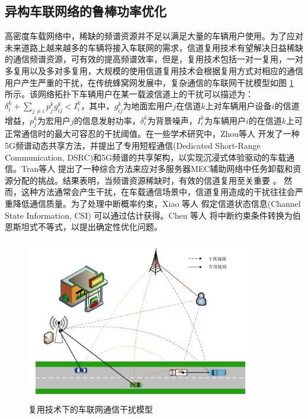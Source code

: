 \subsection{异构车联网络的鲁棒功率优化} \label{section1-2-1}

高密度车载网络中，稀缺的频谱资源并不足以满足大量的车辆用户使用。为了应对未来道路上越来越多的车辆将接入车联网的需求，信道复用技术有望解决日益稀缺的通信频谱资源，可有效的提高频谱效率，但是，复用技术包括一对一复用，一对多复用以及多对多复用，大规模的使用信道复用技术会根据复用方式对相应的通信用户产生严重的干扰，在传统蜂窝网发展中，复杂通信的车联网干扰模型如图 \ref{复用技术下的通信干扰模型} 所示。该网络拓扑下车辆用户在某一载波信道上的干扰可以描述为：$\delta _{i}^{k}+\sum\limits_{j\ne i}{p_{j}^{k}g_{ij}^{k}}<I_{i}^{k}$，其中，$g_{ij}^{k}$为地面宏用户$j$在信道$k$上对车辆用户设备$i$的信道增益，$p_{j}^{k}$为宏用户$j$的信息发射功率，$\delta _{i}^{k}$为背景噪声，$I_{i}^{k}$为车辆用户$i$的在信道$k$上可正常通信时的最大可容忍的干扰阈值。在一些学术研究中，Zhou等人  \supercite{Zhou2017} 开发了一种5G频谱动态共享方法，并提出了专用短程通信(Dedicated Short-Range Communication, DSRC)和5G频谱的共享架构，以实现沉浸式体验驱动的车载通信。Tran等人  \supercite{Tran2019}  提出了一种综合方法来应对多服务器MEC辅助网络中任务卸载和资源分配的挑战。结果表明，当频谱资源稀缺时，有效的信道复用至关重要 \supercite{Liang2021}。 然而，这种方法通常会产生干扰，在车载通信场景中，信道复用造成的干扰往往会严重降低通信质量。为了处理中断概率约束，Xiao 等人 \supercite{Xiao2020} 假定信道状态信息(Channel State Information, CSI) 可以通过估计获得。Chen 等人 \supercite{Chen2022} 将中断约束条件转换为伯恩斯坦式不等式，以提出确定性优化问题。
\begin{figure}[H]
\centering
\includegraphics[width=10cm]{figures//chap1//车联网的干扰模型.pdf}
\caption{复用技术下的车联网通信干扰模型}
\label{复用技术下的通信干扰模型}
\end{figure}
